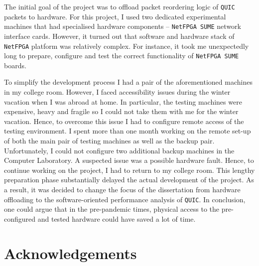 \documentclass[12pt,a4paper,twoside,openright]{report}
\begin{document}
The initial goal of the project was to offload packet reordering logic of \texttt{QUIC} packets to hardware.
For this project, I used two dedicated experimental machines that had specialised hardware components -- \texttt{NetFPGA SUME} network interface cards.
However, it turned out that software and hardware stack of \texttt{NetFPGA} platform was relatively complex.
For instance, it took me unexpectedly long to prepare, configure and test the correct functionality of  \texttt{NetFPGA SUME} boards.

To simplify the development process I had a pair of the aforementioned machines in my college room.
However, I faced accessibility issues during the winter vacation when I was abroad at home.
In particular, the testing machines were expensive, heavy and fragile so I could not take them with me for the winter vacation.
Hence, to overcome this issue I had to configure remote access of the testing environment.
I spent more than one month working on the remote set-up of both the main pair of testing machines as well as the backup pair.
Unfortunately, I could not configure two additional backup machines in the Computer Laboratory.
A suspected issue was a possible hardware fault.
Hence, to continue working on the project, I had to return to my college room.
This lengthy preparation phase substantially delayed the actual development of the project.
As a result, it was decided to change the focus of the dissertation from hardware offloading to the software-oriented performance analysis of \texttt{QUIC}. 
In conclusion, one could argue that in the pre-pandemic times, physical access to the pre-configured and tested hardware could have saved a lot of time.






\tableofcontents

\listoffigures

\newpage
\section*{Acknowledgements}
\end{document}
